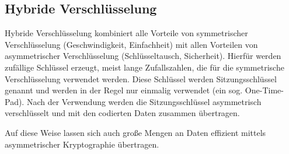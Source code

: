 \subsection{Hybride Verschlüsselung}
\label{sec:hybride_verschl}

Hybride Verschlüsselung kombiniert alle Vorteile von symmetrischer Verschlüsselung (Geschwindigkeit, Einfachheit) mit allen Vorteilen von asymmetrischer Verschlüsselung (Schlüsseltausch, Sicherheit).
Hierfür werden zufällige Schlüssel erzeugt, meist lange Zufallszahlen, die für die symmetrische Verschlüsselung verwendet werden. Diese Schlüssel werden Sitzungsschlüssel genannt und werden in der Regel nur einmalig verwendet (ein sog. One-Time-Pad). Nach der Verwendung werden die Sitzungsschlüssel asymmetrisch verschlüsselt und mit den codierten Daten zusammen übertragen.

Auf diese Weise lassen sich auch große Mengen an Daten effizient mittels asymmetrischer Kryptographie übertragen.
